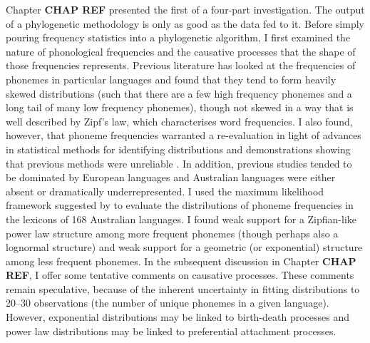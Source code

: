 Chapter \textbf{CHAP REF} presented the first of a four-part investigation. The output of a phylogenetic methodology is only as good as the data fed to it. Before simply pouring frequency statistics into a phylogenetic algorithm, I first examined the nature of phonological frequencies and the causative processes that the shape of those frequencies represents. Previous literature has looked at the frequencies of phonemes in particular languages and found that they tend to form heavily skewed distributions (such that there are a few high frequency phonemes and a long tail of many low frequency phonemes), though not skewed in a way that is well described by Zipf's law, which characterises word frequencies. I also found, however, that phoneme frequencies warranted a re-evaluation in light of advances in statistical methods for identifying distributions and demonstrations showing that previous methods were unreliable \autocite{clauset_power-law_2009}. In addition, previous studies tended to be dominated by European languages and Australian languages were either absent or dramatically underrepresented. I used the maximum likelihood framework suggested by \textcite{clauset_power-law_2009} to evaluate the distributions of phoneme frequencies in the lexicons of 168 Australian languages. I found weak support for a Zipfian-like power law structure among more frequent phonemes (though perhaps also a lognormal structure) and weak support for a geometric (or exponential) structure among less frequent phonemes. In the subsequent discussion in Chapter \textbf{CHAP REF}, I offer some tentative comments on causative processes. These comments remain speculative, because of the inherent uncertainty in fitting distributions to 20--30 observations (the number of unique phonemes in a given language). However, exponential distributions may be linked to birth-death processes and power law distributions may be linked to preferential attachment processes.

